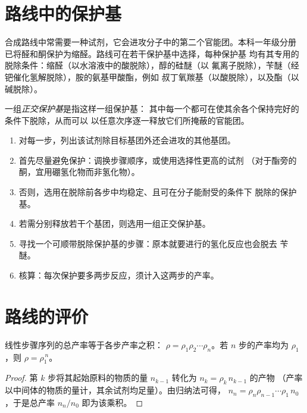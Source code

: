 \section{路线中的保护基}

合成路线中常需要一种试剂，它会进攻分子中的第二个官能团。本科一年级分册
已将醛和酮保护为缩醛。路线可在若干保护基中选择，每种保护基
均有其专用的脱除条件：缩醛（以水溶液中的酸脱除），醇的硅醚（以
氟离子脱除），苄醚（经钯催化氢解脱除），胺的氨基甲酸酯，例如
叔丁氧羰基（以酸脱除），以及酯（以碱脱除）。

\begin{definition}[正交保护]\label{def:b2:retrosynthesis:orthogonal}
一组\emph{正交保护基}是指这样一组保护基：
其中每一个都可在使其余各个保持完好的条件下脱除，从而可以
以任意次序逐一释放它们所掩蔽的官能团。
\end{definition}

\begin{method}[路线中的保护]\label{met:b2:retrosynthesis:protect-in-route}
\begin{enumerate}
  \item 对每一步，列出该试剂除目标基团外还会进攻的其他基团。
  \item 首先尽量避免保护：调换步骤顺序，或使用选择性更高的试剂
        （对于酯旁的酮，宜用硼氢化物而非氢化物）。
  \item 否则，选用在脱除前各步中均稳定、且可在分子能耐受的条件下
        脱除的保护基。
  \item 若需分别释放若干个基团，则选用一组正交保护基。
  \item 寻找一个可顺带脱除保护基的步骤：原本就要进行的氢化反应也会脱去
        苄醚。
  \item 核算：每次保护要多两步反应，须计入这两步的产率。
\end{enumerate}
\end{method}

\section{路线的评价}\label{sec:b2:retrosynthesis:judging}

\begin{proposition}[总产率]\label{prop:b2:retrosynthesis:overall-yield}
线性步骤序列的总产率等于各步产率之积：
$\rho = \rho_1 \rho_2 \cdots \rho_n$。若 $n$ 步的产率均为 $\rho_1$，则 $\rho = \rho_1^{\,n}$。
\end{proposition}

\begin{proof}
第 $k$ 步将其起始原料的物质的量 $n_{k-1}$ 转化为 $n_k = \rho_k\, n_{k-1}$ 的产物
（产率以中间体的物质的量计，其余试剂均足量）。由归纳法可得，
$n_n = \rho_n \rho_{n-1} \cdots \rho_1\, n_0$，于是总产率 $n_n/n_0$ 即为该乘积。
\end{proof}

